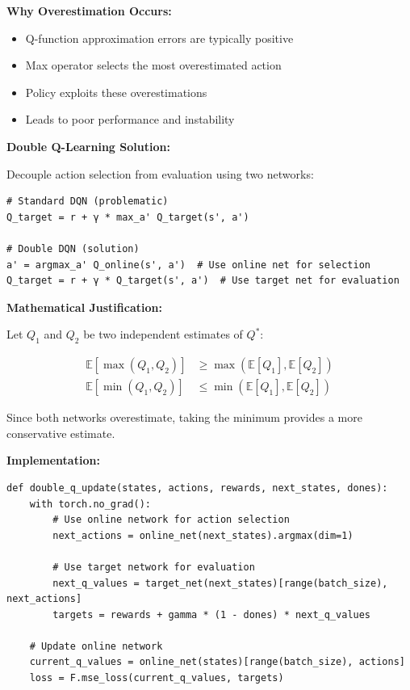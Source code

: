 \documentclass[12pt]{article}
\begin{document}
{{\textbf{Why Overestimation Occurs:}
\begin{itemize}
\item Q-function approximation errors are typically positive
\item Max operator selects the most overestimated action
\item Policy exploits these overestimations
\item Leads to poor performance and instability
\end{itemize}

\textbf{Double Q-Learning Solution:}

Decouple action selection from evaluation using two networks:

\begin{verbatim}
# Standard DQN (problematic)
Q_target = r + γ * max_a' Q_target(s', a')

# Double DQN (solution)
a' = argmax_a' Q_online(s', a')  # Use online net for selection
Q_target = r + γ * Q_target(s', a')  # Use target net for evaluation
\end{verbatim}

\textbf{Mathematical Justification:}

Let $Q_1$ and $Q_2$ be two independent estimates of $Q^*$:

\begin{align}
\mathbb{E}[\max(Q_1, Q_2)] &\geq \max(\mathbb{E}[Q_1], \mathbb{E}[Q_2]) \\
\mathbb{E}[\min(Q_1, Q_2)] &\leq \min(\mathbb{E}[Q_1], \mathbb{E}[Q_2])
\end{align}

Since both networks overestimate, taking the minimum provides a more conservative estimate.

\textbf{Implementation:}

\begin{verbatim}
def double_q_update(states, actions, rewards, next_states, dones):
    with torch.no_grad():
        # Use online network for action selection
        next_actions = online_net(next_states).argmax(dim=1)
        
        # Use target network for evaluation
        next_q_values = target_net(next_states)[range(batch_size), next_actions]
        targets = rewards + gamma * (1 - dones) * next_q_values
    
    # Update online network
    current_q_values = online_net(states)[range(batch_size), actions]
    loss = F.mse_loss(current_q_values, targets)
    

\end{verbatim}}}
\end{document}
